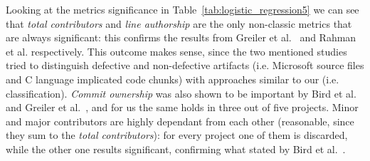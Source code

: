 Looking at the metrics significance in Table~\ref{tab:logistic_regression5} we can see that \textit{total contributors} and \textit{line authorship} are the only non-classic metrics that are always significant: this confirms the results from Greiler et al.~\cite{Greiler:replication} and Rahman et al. respectively. This outcome makes sense, since the two mentioned studies tried to distinguish defective and non-defective artifacts (i.e. Microsoft source files and C language implicated code chunks) with approaches similar to our (i.e. classification). \textit{Commit ownership} was also shown to be important by Bird et al.~\cite{bird:original} and Greiler et al.~\cite{Greiler:replication}, and for us the same holds in three out of five projects. Minor and major contributors are highly dependant from each other (reasonable, since they sum to the \textit{total contributors}): for every project one of them is discarded, while the other one results significant, confirming what stated by Bird et al.~\cite{bird:original}.



